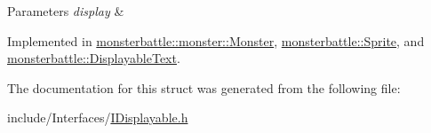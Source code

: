 \begin{DoxyParams}{Parameters}
{\em display} & \\
\hline
\end{DoxyParams}


Implemented in \hyperlink{classmonsterbattle_1_1monster_1_1Monster_af821d28493e308134ed5d7cad2e567a4}{monsterbattle\+::monster\+::\+Monster}, \hyperlink{classmonsterbattle_1_1Sprite_a9e4c8986170e84e1e92e65d92af4ffee}{monsterbattle\+::\+Sprite}, and \hyperlink{classmonsterbattle_1_1DisplayableText_a72ae86bced600e25c38ecceb2867e881}{monsterbattle\+::\+Displayable\+Text}.



The documentation for this struct was generated from the following file\+:\begin{DoxyCompactItemize}
\item 
include/\+Interfaces/\hyperlink{IDisplayable_8h}{I\+Displayable.\+h}\end{DoxyCompactItemize}
